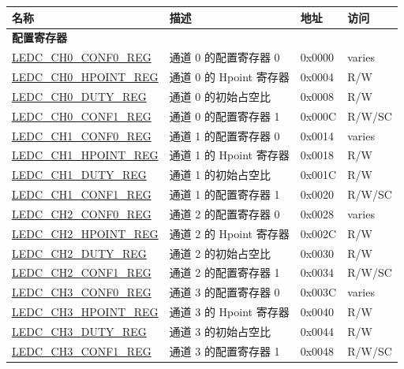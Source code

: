 \begin{longtable}{ | p{6cm} | p{4.5cm} | p{1.3cm} | p{1.7cm} | }
\hline\rowcolor{lightgray}
\textbf{名称} & \textbf{描述} & \textbf{地址} & \textbf{访问}\\ \hline
\endhead
\multicolumn{4}{|l|}{\textbf{配置寄存器}} \\ \hline
\hyperref[regdesc:LEDCCHNCONF0REG]{LEDC\_CH0\_CONF0\_REG} & 通道 0 的配置寄存器 0 & 0x0000 & varies \\ \hline
\hyperref[regdesc:LEDCCHNHPOINTREG]{LEDC\_CH0\_HPOINT\_REG} & 通道 0 的 Hpoint 寄存器 & 0x0004 & R/W \\ \hline
\hyperref[regdesc:LEDCCHNDUTYREG]{LEDC\_CH0\_DUTY\_REG} & 通道 0 的初始占空比 & 0x0008 & R/W \\ \hline
\hyperref[regdesc:LEDCCHNCONF1REG]{LEDC\_CH0\_CONF1\_REG} & 通道 0 的配置寄存器 1 & 0x000C & R/W/SC \\ \hline
\hyperref[regdesc:LEDCCHNCONF0REG]{LEDC\_CH1\_CONF0\_REG} & 通道 1 的配置寄存器 0 & 0x0014 & varies \\ \hline
\hyperref[regdesc:LEDCCHNHPOINTREG]{LEDC\_CH1\_HPOINT\_REG} & 通道 1 的 Hpoint 寄存器 & 0x0018 & R/W \\ \hline
\hyperref[regdesc:LEDCCHNDUTYREG]{LEDC\_CH1\_DUTY\_REG} & 通道 1 的初始占空比 & 0x001C & R/W \\ \hline
\hyperref[regdesc:LEDCCHNCONF1REG]{LEDC\_CH1\_CONF1\_REG} & 通道 1 的配置寄存器 1 & 0x0020 & R/W/SC \\ \hline
\hyperref[regdesc:LEDCCHNCONF0REG]{LEDC\_CH2\_CONF0\_REG} & 通道 2 的配置寄存器 0 & 0x0028 & varies \\ \hline
\hyperref[regdesc:LEDCCHNHPOINTREG]{LEDC\_CH2\_HPOINT\_REG} & 通道 2 的 Hpoint 寄存器 & 0x002C & R/W \\ \hline
\hyperref[regdesc:LEDCCHNDUTYREG]{LEDC\_CH2\_DUTY\_REG} & 通道 2 的初始占空比 & 0x0030 & R/W \\ \hline
\hyperref[regdesc:LEDCCHNCONF1REG]{LEDC\_CH2\_CONF1\_REG} & 通道 2 的配置寄存器 1 & 0x0034 & R/W/SC \\ \hline
\hyperref[regdesc:LEDCCHNCONF0REG]{LEDC\_CH3\_CONF0\_REG} & 通道 3 的配置寄存器 0 & 0x003C & varies \\ \hline
\hyperref[regdesc:LEDCCHNHPOINTREG]{LEDC\_CH3\_HPOINT\_REG} & 通道 3 的 Hpoint 寄存器 & 0x0040 & R/W \\ \hline
\hyperref[regdesc:LEDCCHNDUTYREG]{LEDC\_CH3\_DUTY\_REG} & 通道 3 的初始占空比 & 0x0044 & R/W \\ \hline
\hyperref[regdesc:LEDCCHNCONF1REG]{LEDC\_CH3\_CONF1\_REG} & 通道 3 的配置寄存器 1 & 0x0048 & R/W/SC \\ \hline

\end{longtable}
